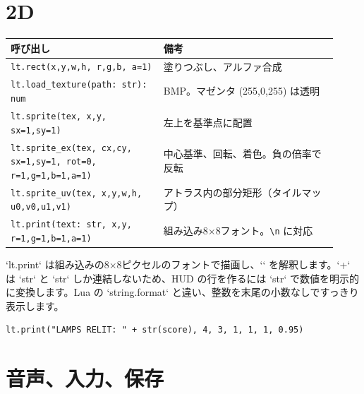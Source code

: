 \section{2D}

\begin{center}
\small\begin{tabular}{@{}p{0.43\linewidth}p{0.49\linewidth}@{}}
\toprule
\textbf{呼び出し} & \textbf{備考} \\
\midrule
\texttt{lt.rect(x,y,w,h, r,g,b, a=1)} & 塗りつぶし、アルファ合成 \\
\texttt{lt.load\_texture(path: str): num} & BMP。マゼンタ (255,0,255) は透明 \\
\texttt{lt.sprite(tex, x,y, sx=1,sy=1)} & 左上を基準点に配置 \\
\texttt{lt.sprite\_ex(tex, cx,cy, sx=1,sy=1, rot=0, r=1,g=1,b=1,a=1)} & 中心基準、回転、着色。負の倍率で反転 \\
\texttt{lt.sprite\_uv(tex, x,y,w,h, u0,v0,u1,v1)} & アトラス内の部分矩形（タイルマップ） \\
\texttt{lt.print(text: str, x,y, r=1,g=1,b=1,a=1)} & 組み込み8$\times$8フォント。\texttt{\textbackslash n} に対応 \\
\bottomrule
\end{tabular}
\end{center}

\noindent
`lt.print` は組み込みの8×8ピクセルのフォントで描画し、`\n` を解釈します。`+` は `str` と `str` しか連結しないため、HUD の行を作るには `str` で数値を明示的に変換します。Lua の `string.format` と違い、整数を末尾の小数なしですっきり表示します。

\begin{lstlisting}[language=wick]
lt.print("LAMPS RELIT: " + str(score), 4, 3, 1, 1, 1, 0.95)
\end{lstlisting}

\section{音声、入力、保存}

